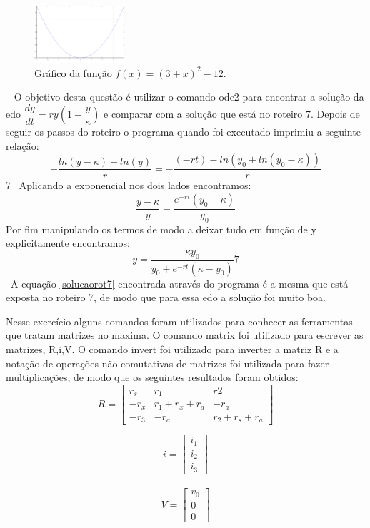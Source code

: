 \documentclass[a4wide]{report}
\begin{document}
\
\begin{figure}[h]
\centering
\includegraphics[width=0.30\textwidth]{05.pdf}
\caption{Gráfico da função $f(x)=(3+x)^{2}-12$.}
\label{05}
\end{figure}
\
 O objetivo desta questão é utilizar o comando ode2 para encontrar a solução da edo $\dfrac{dy}{dt}=ry(1-\dfrac{y}{\kappa})$ e comparar com a solução que está no roteiro 7. Depois de seguir os passos do roteiro o programa quando foi executado imprimiu a seguinte relação:
\begin{equation}
-\dfrac{ln(y-\kappa)-ln(y)}{r}=-\dfrac{(-rt)-ln(y_{0}+ln(y_{0}-\kappa))}{r}
\end{equation}7
\
Aplicando a exponencial nos dois lados encontramos:
\begin{equation}
\dfrac{y-\kappa}{y}=\dfrac{e^{-rt}(y_{0}-\kappa)}{y_{0}}
\end{equation}
Por fim manipulando os termos de modo a deixar tudo em função de y explicitamente encontramos:
\begin{equation}
y=\dfrac{\kappa y_{0}}{y_{0}+e^{-rt}(\kappa - y_{0})}7
\label{solucaorot7}
\end{equation}
\
A equação \ref{solucaorot7} encontrada através do programa é a mesma que está exposta no roteiro 7, de modo que para essa edo a solução foi muito boa.
\

 Nesse exercício alguns comandos foram utilizados para conhecer as ferramentas que tratam matrizes no maxima. O comando matrix foi utilizado para escrever as matrizes, R,i,V. O comando invert foi utilizado para inverter a matriz R e a notação de operações não comutativas de matrizes foi utilizada para fazer multiplicações, de modo que os seguintes resultados foram obtidos:
\[
R=
  \begin{bmatrix}
    r_{s} & r_{1} & r{2} \\
    -r_{x} & r_{1} + r_{x} + r_{a} & -r_{a} \\
    -r_{3} & -r_{a} & r_{2} + r_{s} +r_{a} 
  \end{bmatrix}
\]

\[
i=
  \begin{bmatrix}
    i_{1} \\
    i_{2} \\
    i_{3}
  \end{bmatrix}
\]
\\
\[
V=
  \begin{bmatrix}
   v_{0} \\
   0 \\
    0 
  \end{bmatrix}
\]
\end{document}
